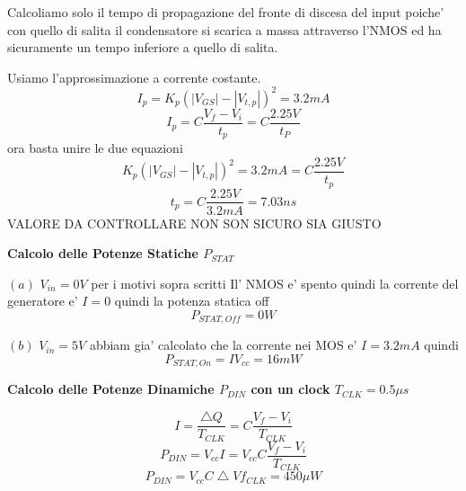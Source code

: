 \documentclass[\main/main.tex]{subfiles}
\begin{document}
Calcoliamo solo il tempo di propagazione del fronte di discesa del input poiche' con quello di salita il condensatore si scarica a massa attraverso l'NMOS ed ha sicuramente un tempo inferiore a quello di salita.

Usiamo l'approssimazione a corrente costante.
\[I_p = K_p \left(|V_{GS}| - |V_{t,p}| \right)^2 = 3.2mA\]
\[I_p = C \frac{V_f - V_i}{t_p} = C \frac{2.25V}{t_P}\]
ora basta unire le due equazioni
\[ K_p \left(|V_{GS}| - |V_{t,p}| \right)^2 = 3.2mA = C \frac{2.25V}{t_p}\]
\[t_p = C \frac{2.25V}{3.2mA} = 7.03ns\]
VALORE DA CONTROLLARE NON SON SICURO SIA GIUSTO

\clearpage
\textbf{Calcolo delle Potenze Statiche $P_{STAT}$}

$(a)$ $V_{in} = 0V$ per i motivi sopra scritti Il' NMOS e' spento quindi la corrente del generatore e' $I = 0$ quindi la potenza statica off
\[P_{STAT,Off} = 0W\]

$(b)$ $V_{in} = 5V$ abbiam gia' calcolato che la corrente nei MOS e' $I = 3.2mA$ quindi
\[ P_{STAT,On} = I V_{cc} = 16mW\]

\textbf{Calcolo delle Potenze Dinamiche $P_{DIN}$ con un clock $T_{CLK} = 0.5 \mu s$}

\[ I = \frac{\bigtriangleup Q}{T_{CLK}} = C \frac{V_f - V_i}{T_{CLK}}\]
\[ P_{DIN} = V_{cc} I = V_{cc} C \frac{V_f - V_i}{T_{CLK}}\]
\[ P_{DIN} = V_{cc} C \bigtriangleup V f_{CLK} = 450 \mu W\]
\end{document}
